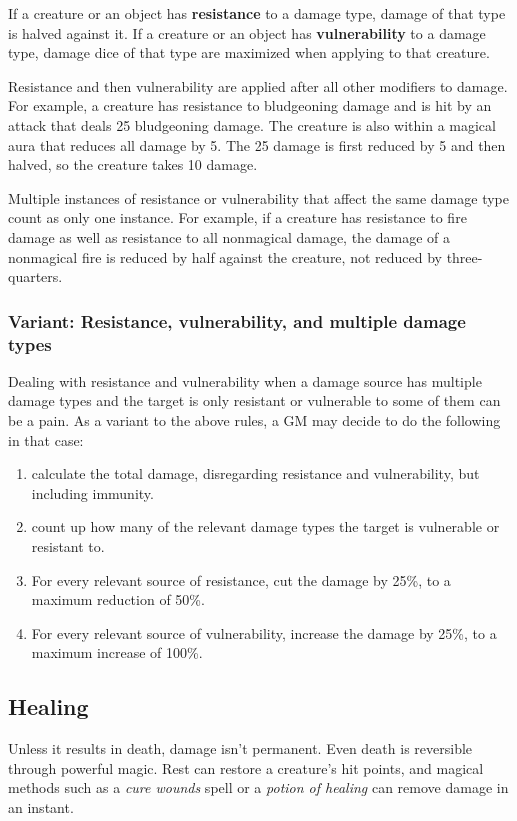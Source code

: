 If a creature or an object has \textbf{resistance} to a damage type, damage of that type is halved against it. If a creature or an object has \textbf{vulnerability} to a damage type, damage dice of that type are maximized when applying to that creature.

Resistance and then vulnerability are applied after all other modifiers to damage. For example, a creature has resistance to bludgeoning damage and is hit by an attack that deals 25 bludgeoning damage. The creature is also within a magical aura that reduces all damage by 5. The 25 damage is first reduced by 5 and then halved, so the creature takes 10 damage.

Multiple instances of resistance or vulnerability that affect the same damage type count as only one instance. For example, if a creature has resistance to fire damage as well as resistance to all nonmagical damage, the damage of a nonmagical fire is reduced by half against the creature, not reduced by three-quarters.

\subsubsection{Variant: Resistance, vulnerability, and multiple damage types}
Dealing with resistance and vulnerability when a damage source has multiple damage types and the target is only resistant or vulnerable to some of them can be a pain. As a variant to the above rules, a GM may decide to do the following in that case:
\begin{enumerate}
    \item calculate the total damage, disregarding resistance and vulnerability, but including immunity.
    \item count up how many of the relevant damage types the target is vulnerable or resistant to.
    \item For every relevant source of resistance, cut the damage by 25\%, to a maximum reduction of 50\%.
    \item For every relevant source of vulnerability, increase the damage by 25\%, to a maximum increase of 100\%.
\end{enumerate}

\subsection{Healing}

Unless it results in death, damage isn't permanent. Even death is reversible through powerful magic. Rest can restore a creature's hit points, and magical methods such as a \textit{cure wounds} spell or a \textit{potion of healing} can remove damage in an instant.

